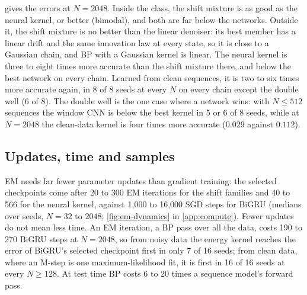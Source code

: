  gives the errors at $N=2048$. Inside the class, the shift mixture is as good as the neural kernel, or
better (bimodal), and both are far below the networks. Outside it, the shift mixture is no better than the linear
denoiser: its best member has a linear drift and the same innovation law at every state, so it is close to a Gaussian
chain, and BP with a Gaussian kernel is linear. The neural kernel is three to eight times more accurate than the
shift mixture there, and below the best network on every chain. Learned from clean sequences, it is two to six times
more accurate again, in 8 of 8 seeds at every $N$ on every chain except the double well (6 of 8). The double well is
the one case where a network wins: with $N\le512$ sequences the window CNN is below the best kernel in 5 or 6 of 8
seeds, while at $N=2048$ the clean-data kernel is four times more accurate ($0.029$ against $0.112$).

\subsection{Updates, time and samples}
\label{sec:steps}

EM needs far fewer parameter updates than gradient training: the selected checkpoints come after 20 to 300 EM
iterations for the shift families and 40 to 566 for the neural kernel, against 1{,}000 to 16{,}000 SGD steps for BiGRU
(medians over seeds, $N=32$ to $2048$; \cref{fig:em-dynamics} in \cref{app:compute}).
Fewer updates do not mean less time. An EM iteration, a BP pass over all the data, costs 190 to 270 BiGRU steps at
$N=2048$, so from noisy data the energy kernel reaches the error of BiGRU's selected checkpoint first in only 7 of 16
seeds; from clean data, where an M-step is one maximum-likelihood fit, it is first in 16 of 16 seeds at every
$N\geq128$. At test time BP costs 6 to 20 times a sequence model's forward pass.

